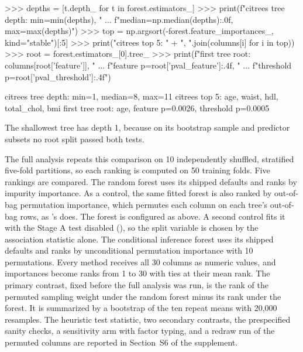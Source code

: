 \documentclass[article]{jss}
\newcommand{\citrees}{\pkg{citrees}\xspace}
\newcommand{\sklearn}{\pkg{scikit-learn}\xspace}
\begin{document}
\begin{CodeChunk}
\begin{CodeInput}
>>> depths = [t.depth_ for t in forest.estimators_]
>>> print(f"citrees tree depth: min={min(depths)}, "
...       f"median={np.median(depths):.0f}, max={max(depths)}")
>>> top = np.argsort(-forest.feature_importances_, kind="stable")[:5]
>>> print("citrees top 5: " + ", ".join(columns[i] for i in top))
>>> root = forest.estimators_[0].tree_
>>> print(f"first tree root: {columns[root['feature']]}, "
...       f"feature p={root['pval_feature']:.4f}, "
...       f"threshold p={root['pval_threshold']:.4f}")
\end{CodeInput}
\begin{CodeOutput}
citrees tree depth: min=1, median=8, max=11
citrees top 5: age, waist, hdl, total_chol, bmi
first tree root: age, feature p=0.0026, threshold p=0.0005
\end{CodeOutput}
\end{CodeChunk}
%
The shallowest tree has depth 1, because on its bootstrap sample and predictor
subsets no root split passed both tests.

The full analysis repeats this comparison on 10 independently shuffled,
stratified five-fold partitions, so each ranking is computed on 50 training
folds. Five rankings are compared. The \sklearn random forest uses its shipped
defaults and ranks by impurity importance. As a control, the same fitted
forest is also ranked by out-of-bag permutation importance, which permutes
each column on each tree's out-of-bag rows, as 's 
does. The \citrees forest is configured as above. A second control fits it
with the Stage A test disabled (), so the split
variable is chosen by the association statistic alone. The 
conditional inference forest uses its shipped defaults and ranks by
unconditional permutation importance with 10 permutations. Every method
receives all 30 columns as numeric values, and importances become ranks from 1
to 30 with ties at their mean rank. The primary contrast, fixed before the
full analysis was run, is the rank of the permuted sampling weight under the
random forest minus its rank under the \citrees forest. It is summarized by a
bootstrap of the ten repeat means with 20,000 resamples. The heuristic test
statistic, two secondary contrasts, the prespecified sanity checks, a
sensitivity arm with factor typing, and a redraw run of the permuted columns
are reported in Section~S6 of the supplement.
\end{document}
